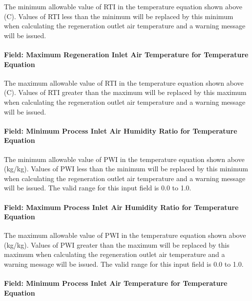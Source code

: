 The minimum allowable value of RTI in the temperature equation shown above (C). Values of RTI less than the minimum will be replaced by this minimum when calculating the regeneration outlet air temperature and a warning message will be issued.

\paragraph{Field: Maximum Regeneration Inlet Air Temperature for Temperature Equation}\label{field-maximum-regeneration-inlet-air-temperature-for-temperature-equation}

The maximum allowable value of RTI in the temperature equation shown above (C). Values of RTI greater than the maximum will be replaced by this maximum when calculating the regeneration outlet air temperature and a warning message will be issued.

\paragraph{Field: Minimum Process Inlet Air Humidity Ratio for Temperature Equation}\label{field-minimum-process-inlet-air-humidity-ratio-for-temperature-equation}

The minimum allowable value of PWI in the temperature equation shown above (kg/kg). Values of PWI less than the minimum will be replaced by this minimum when calculating the regeneration outlet air temperature and a warning message will be issued. The valid range for this input field is 0.0 to 1.0.

\paragraph{Field: Maximum Process Inlet Air Humidity Ratio for Temperature Equation}\label{field-maximum-process-inlet-air-humidity-ratio-for-temperature-equation}

The maximum allowable value of PWI in the temperature equation shown above (kg/kg). Values of PWI greater than the maximum will be replaced by this maximum when calculating the regeneration outlet air temperature and a warning message will be issued. The valid range for this input field is 0.0 to 1.0.

\paragraph{Field: Minimum Process Inlet Air Temperature for Temperature Equation}\label{field-minimum-process-inlet-air-temperature-for-temperature-equation}

